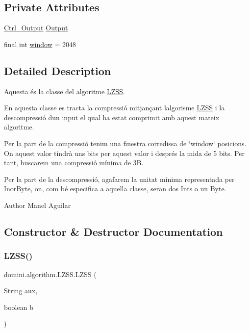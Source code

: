 \subsection*{Private Attributes}
\begin{DoxyCompactItemize}
\item 
\hyperlink{classpersistencia_1_1output_1_1Ctrl__Output}{Ctrl\+\_\+\+Output} \hyperlink{classdomini_1_1algorithm_1_1LZSS_ab15cbc33a0590c2ac42127ca16821fef}{Output}
\item 
final int \hyperlink{classdomini_1_1algorithm_1_1LZSS_a00d9f2e9bc2baa39513fad040b8e7123}{window} = 2048
\end{DoxyCompactItemize}


\subsection{Detailed Description}
Aquesta és la classe del algoritme \hyperlink{classdomini_1_1algorithm_1_1LZSS}{L\+Z\+SS}. 

En aquesta classe es tracta la compressió mitjançant l\textquotesingle{}algorisme \hyperlink{classdomini_1_1algorithm_1_1LZSS}{L\+Z\+SS} i la descompressió d\textquotesingle{}un input el qual ha estat comprimit amb aquest mateix algoritme.

Per la part de la compressió tenim una finestra corredissa de \char`\"{}window\char`\"{} posicions. On aquest valor tindrà uns bits per aquest valor i després la mida de 5 bits. Per tant, buscarem una compressió mínima de 3B.

Per la part de la descompressió, agafarem la unitat mínima representada per Inor\+Byte, on, com bé especifica a aquella classe, seran dos Int\textquotesingle{}s o un Byte.

\begin{DoxyAuthor}{Author}
Manel Aguilar 
\end{DoxyAuthor}


\subsection{Constructor \& Destructor Documentation}
\mbox{\label{classdomini_1_1algorithm_1_1LZSS_a991f29ccc89ecbb5645ea8f123205e20}} 
\subsubsection{\texorpdfstring{L\+Z\+S\+S()}{LZSS()}}
{\footnotesize\ttfamily domini.\+algorithm.\+L\+Z\+S\+S.\+L\+Z\+SS (\begin{DoxyParamCaption}\item[{String}]{aux,  }\item[{boolean}]{b }\end{DoxyParamCaption})\hspace{0.3cm}{\ttfamily [inline]}}



